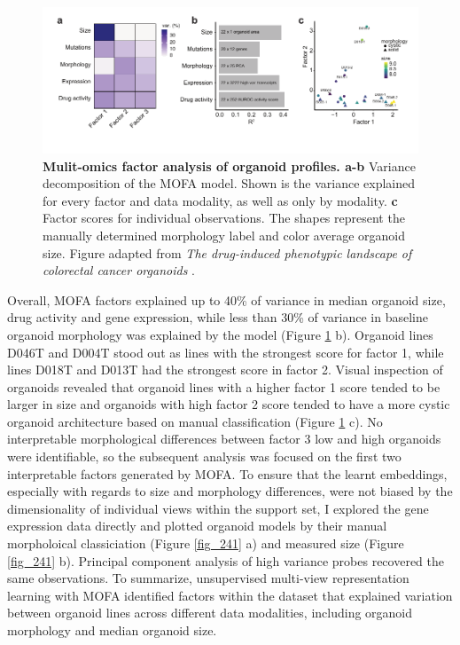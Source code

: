 \begin{flushleft}
\begin{figure}[!h]
\centering
\includegraphics[width=\textwidth,
                height=\textheight,
                keepaspectratio]{figures/promise/pdf/fig_4_0.pdf}
\caption[Mulit-omics factor analysis of organoid profiles]{\textbf{Mulit-omics factor analysis of organoid profiles. a-b} Variance decomposition of the MOFA model. Shown is the variance explained for every factor and data modality, as well as only by modality. \textbf{c} Factor scores for individual observations. The shapes represent the manually determined morphology label and color average organoid size. Figure adapted from \textit{The drug-induced phenotypic landscape of colorectal cancer organoids} \citep{betgeDruginducedPhenotypicLandscape2022}.}
\label{fig_240}
\end{figure}
\bigbreak

Overall, MOFA factors explained up to 40\% of variance in median organoid size, drug activity and gene expression, while less than 30\% of variance in baseline organoid morphology was explained by the model (Figure \ref{fig_240} b). Organoid lines D046T and D004T stood out as lines with the strongest score for factor 1, while lines D018T and D013T had the strongest score in factor 2. Visual inspection of organoids revealed that organoid lines with a higher factor 1 score tended to be larger in size and organoids with high factor 2 score tended to have a more cystic organoid architecture based on manual classification (Figure \ref{fig_240} c). No interpretable morphological differences between factor 3 low and high organoids were identifiable, so the subsequent analysis was focused on the first two interpretable factors generated by MOFA. To ensure that the learnt embeddings, especially with regards to size and morphology differences, were not biased by the dimensionality of individual views within the support set, I explored the gene expression data directly and plotted organoid models by their manual morpholoical classiciation (Figure \ref{fig_241} a) and measured size (Figure \ref{fig_241} b). Principal component analysis of high variance probes recovered the same observations. To summarize, unsupervised multi-view representation learning with MOFA identified factors within the dataset that explained variation between organoid lines across different data modalities, including organoid morphology and median organoid size. 


\end{flushleft}
